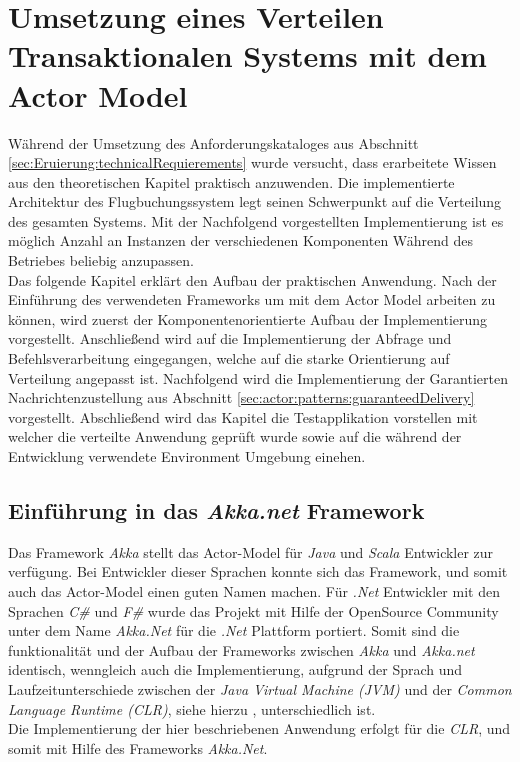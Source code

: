 \chapter{Umsetzung eines Verteilen Transaktionalen Systems mit dem Actor Model} 
\label{cha:practicalDevelopment}

Während der Umsetzung des Anforderungskataloges aus Abschnitt \ref{sec:Eruierung:technicalRequierements} wurde versucht, dass erarbeitete Wissen aus den theoretischen Kapitel praktisch anzuwenden. Die implementierte Architektur des Flugbuchungssystem legt seinen Schwerpunkt auf die Verteilung des gesamten Systems. Mit der Nachfolgend vorgestellten Implementierung ist es möglich Anzahl an Instanzen der verschiedenen Komponenten Während des Betriebes beliebig anzupassen. \\
Das folgende Kapitel erklärt den Aufbau der praktischen Anwendung. Nach der Einführung des verwendeten Frameworks um mit dem Actor Model arbeiten zu können, wird zuerst der Komponentenorientierte Aufbau der Implementierung vorgestellt. Anschließend wird auf die Implementierung der Abfrage und Befehlsverarbeitung eingegangen, welche auf die starke Orientierung auf Verteilung angepasst ist. Nachfolgend wird die Implementierung der Garantierten Nachrichtenzustellung aus Abschnitt \ref{sec:actor:patterns:guaranteedDelivery} vorgestellt. Abschließend wird das Kapitel die Testapplikation vorstellen mit welcher die verteilte Anwendung geprüft wurde sowie auf die während der Entwicklung verwendete Environment Umgebung einehen.

\section{Einführung in das \textit{Akka.net} Framework}
Das Framework \textit{Akka} stellt das Actor-Model für \textit{Java} und \textit{Scala} Entwickler zur verfügung. Bei Entwickler dieser Sprachen konnte sich das Framework, und somit auch das Actor-Model einen guten Namen machen. Für \textit{.Net} Entwickler mit den Sprachen \textit{C\#} und \textit{F\#} wurde das Projekt mit Hilfe der OpenSource Community unter dem Name \textit{Akka.Net} für die \textit{.Net} Plattform portiert. Somit sind die funktionalität und der Aufbau der Frameworks zwischen \textit{Akka} und \textit{Akka.net} identisch, wenngleich auch die Implementierung, aufgrund der Sprach und Laufzeitunterschiede zwischen der \textit{Java Virtual Machine (JVM)} und der \textit{Common Language Runtime (CLR)}, siehe hierzu \cite{JvmVsClrsinger2003jvm}, unterschiedlich ist. \\
Die Implementierung der hier beschriebenen Anwendung erfolgt für die \textit{CLR}, und somit mit Hilfe des Frameworks \textit{Akka.Net}. 

